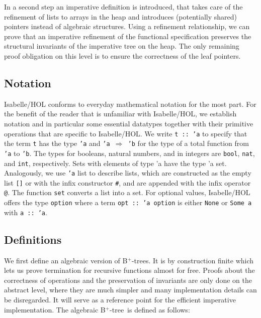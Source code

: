 \documentclass[a4paper,UKenglish,cleveref, autoref, thm-restate]{lipics-v2021}
\newcommand{\btree}{B$^+$-tree}
\newcommand{\btrees}{B$^+$-trees}
\begin{document}
In a second step an imperative definition is introduced,
that takes care of the refinement of lists to arrays in the heap
and introduces (potentially shared) pointers instead of algebraic structures.
Using a refinement relationship, we can prove that an imperative refinement
of the functional specification preserves the structural invariants
of the imperative tree on the heap.
The only remaining proof obligation on this level is to ensure the correctness
of the leaf pointers.

\subsection{Notation}

Isabelle/HOL conforms to everyday mathematical notation for the most part.
For the benefit of the reader that is unfamiliar with Isabelle/HOL, we establish
notation and in particular some essential datatypes together with their primitive
operations that are specific to Isabelle/HOL. We write \texttt{t :: 'a} to specify that
the term \texttt{t} has the type \texttt{'a} and \texttt{'a $\Rightarrow$ 'b}
for the type of a total function from \texttt{'a} to \texttt{'b}.
The types for booleans, natural numbers, and in integers are \texttt{bool},
\texttt{nat}, and \texttt{int}, respectively. Sets with elements of type 'a have the type 'a set.
Analogously, we use \texttt{'a} list to describe lists, which are constructed as the empty
list \texttt{[]} or with the infix constructor \texttt{\#}, and are appended with the infix operator
\texttt{@}. The function \texttt{set} converts a list into a set. For optional values, Isabelle/HOL
offers the type \texttt{option} where a term \texttt{opt :: 'a option} is either \texttt{None} or \texttt{Some a}
with \texttt{a :: 'a}.

\subsection{Definitions}
\label{sec:data_structure_defs}


We first define an algebraic version of \btrees.
It is by construction finite which lets us prove termination for recursive functions almost for free.
Proofs about the correctness of operations and the preservation of invariants
are only done on the abstract level, where they are much simpler
and many implementation details can be disregarded.
It will serve as a reference point for the efficient
imperative implementation.
The algebraic \btree\ is defined as follows:
\end{document}
